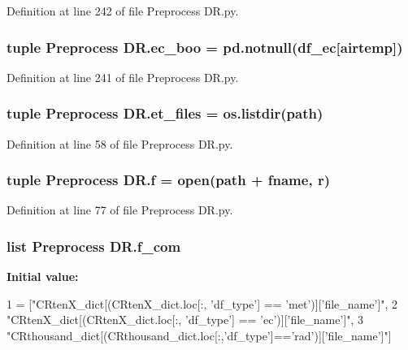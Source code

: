 Definition at line 242 of file Preprocess D\+R.\+py.

\hypertarget{namespace_preprocess_01_d_r_a00e73208d968dff947b8535a5c1fb9d9}{}
\subsubsection[{ec\+\_\+boo}]{\setlength{\rightskip}{0pt plus 5cm}tuple Preprocess D\+R.\+ec\+\_\+boo = pd.\+notnull({\bf df\+\_\+ec}\mbox{[}\textquotesingle{}airtemp\textquotesingle{}\mbox{]})}\label{namespace_preprocess_01_d_r_a00e73208d968dff947b8535a5c1fb9d9}


Definition at line 241 of file Preprocess D\+R.\+py.

\hypertarget{namespace_preprocess_01_d_r_a561be9ad8b22bc2802b0020d8b239176}{}
\subsubsection[{et\+\_\+files}]{\setlength{\rightskip}{0pt plus 5cm}tuple Preprocess D\+R.\+et\+\_\+files = os.\+listdir({\bf path})}\label{namespace_preprocess_01_d_r_a561be9ad8b22bc2802b0020d8b239176}


Definition at line 58 of file Preprocess D\+R.\+py.

\hypertarget{namespace_preprocess_01_d_r_a42c175efe72eeb61c918cffc912baa69}{}
\subsubsection[{f}]{\setlength{\rightskip}{0pt plus 5cm}tuple Preprocess D\+R.\+f = open({\bf path} + fname, \textquotesingle{}r\textquotesingle{})}\label{namespace_preprocess_01_d_r_a42c175efe72eeb61c918cffc912baa69}


Definition at line 77 of file Preprocess D\+R.\+py.

\hypertarget{namespace_preprocess_01_d_r_ac21cb069e78807e25e0ea127740544c8}{}
\subsubsection[{f\+\_\+com}]{\setlength{\rightskip}{0pt plus 5cm}list Preprocess D\+R.\+f\+\_\+com}\label{namespace_preprocess_01_d_r_ac21cb069e78807e25e0ea127740544c8}
{\bfseries Initial value\+:}
\begin{DoxyCode}
1 = [\textcolor{stringliteral}{"CRtenX\_dict[(CRtenX\_dict.loc[:, 'df\_type'] == 'met')]['file\_name']"},
2                  \textcolor{stringliteral}{"CRtenX\_dict[(CRtenX\_dict.loc[:, 'df\_type'] == 'ec')]['file\_name']"},
3                  \textcolor{stringliteral}{"CRthousand\_dict[(CRthousand\_dict.loc[:,'df\_type']=='rad')]['file\_name']"}]
\end{DoxyCode}


